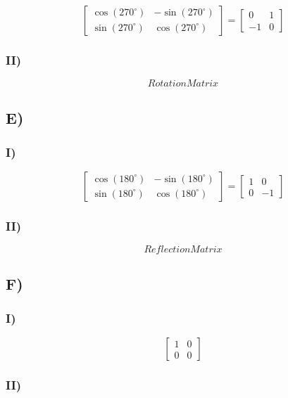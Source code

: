 \documentclass{article}
\begin{document}
\[
	\begin{bmatrix}
		\cos(270^\circ) & -\sin(270^\circ) \\
		\sin(270^\circ) & \cos(270^\circ)
	\end{bmatrix}
	=
	\begin{bmatrix}
		0  & 1 \\
		-1 & 0
	\end{bmatrix}
\]

\subsubsection*{II)}

$$Rotation Matrix$$

\subsection{E)}

\subsubsection*{I)}

\[
	\begin{bmatrix}
		\cos(180^\circ) & -\sin(180^\circ) \\
		\sin(180^\circ) & \cos(180^\circ)
	\end{bmatrix}
	=
	\begin{bmatrix}
		1 & 0  \\
		0 & -1
	\end{bmatrix}
\]

\subsubsection*{II)}

$$Reflection Matrix$$

\subsection{F)}

\subsubsection*{I)}

\[
	\begin{bmatrix}
		1 & 0 \\
		0 & 0
	\end{bmatrix}
\]

\subsubsection*{II)}
\end{document}
